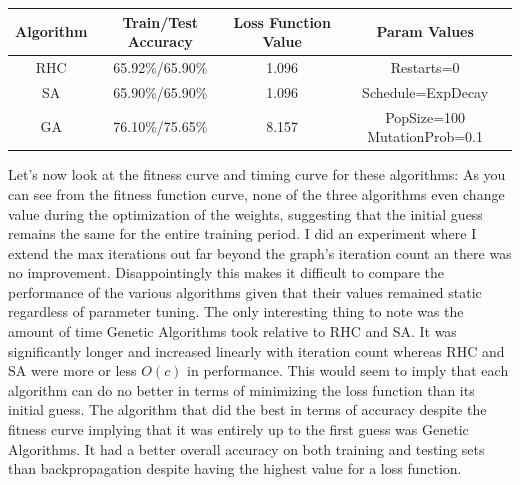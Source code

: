 \documentclass[11pt]{article}
\begin{document}
    \begin{center}
        \begin{tabular}{| c | c | c | c |}
            \hline
            Algorithm & Train/Test Accuracy & Loss Function Value & Param Values                 \\
            \hline
            \hline
            RHC       & 65.92\%/65.90\%     & 1.096               & Restarts=0                   \\
            \hline
            SA        & 65.90\%/65.90\%     & 1.096               & Schedule=ExpDecay            \\
            \hline
            GA        & 76.10\%/75.65\%     & 8.157               & PopSize=100 MutationProb=0.1 \\
            \hline
        \end{tabular}
    \end{center}
    Let's now look at the fitness curve and timing curve for these algorithms:
    As you can see from the fitness function curve, none of the three algorithms even change value during the optimization
    of the weights, suggesting that the initial guess remains the same for the entire training period.
    I did an experiment where I extend the max iterations out far beyond the graph's iteration count an there was no improvement.
    Disappointingly this makes it difficult to compare the performance of the various algorithms given that their values
    remained static regardless of parameter tuning.
    The only interesting thing to note was the amount of time Genetic Algorithms took relative to RHC and SA.
    It was significantly longer and increased linearly with iteration count whereas RHC and SA were more or less $O(c)$ in performance.
    This would seem to imply that each algorithm can do no better in terms of minimizing the loss function than its initial guess.
    The algorithm that did the best in terms of accuracy despite the fitness curve implying that it was entirely up to the first
    guess was Genetic Algorithms.
    It had a better overall accuracy on both training and testing sets than backpropagation despite having the highest value
    for a loss function.
\end{document}
